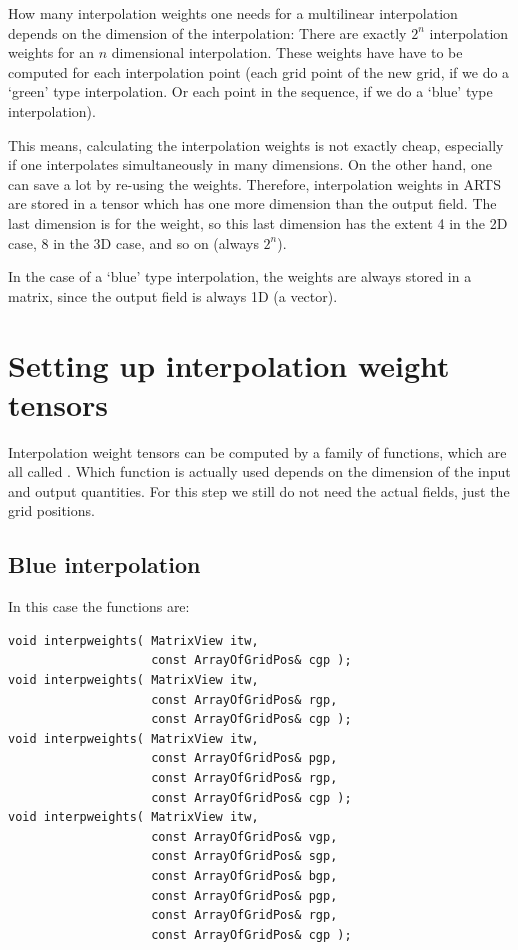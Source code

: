 How many interpolation weights one needs for a multilinear
interpolation depends on the dimension of the interpolation: There are
exactly $2^n$ interpolation weights for an $n$ dimensional
interpolation.  These weights have have to be computed for each
interpolation point (each grid point of the new grid, if we do a
`green' type interpolation. Or each point in the sequence, if we do a
`blue' type interpolation).

This means, calculating the interpolation weights is not exactly
cheap, especially if one interpolates simultaneously in many
dimensions. On the other hand, one can save a lot by re-using the
weights.  Therefore, interpolation weights in ARTS are stored in a
tensor which has one more dimension than the output field. The last
dimension is for the weight, so this last dimension has the extent 4
in the 2D case, 8 in the 3D case, and so on (always $2^n$).

In the case of a `blue' type interpolation, the weights are
always stored in a matrix, since the output field is always 1D (a
vector). 

\section{Setting up interpolation weight tensors}

Interpolation weight tensors can be computed by a family of functions,
which are all called . Which function is actually
used depends on the dimension of the input and output quantities. For
this step we still do not need the actual fields, just the grid
positions.

\subsection{Blue interpolation}

In this case the functions are:

\begin{lstlisting}
void interpweights( MatrixView itw,
                    const ArrayOfGridPos& cgp );
void interpweights( MatrixView itw,
                    const ArrayOfGridPos& rgp,
                    const ArrayOfGridPos& cgp );
void interpweights( MatrixView itw,
                    const ArrayOfGridPos& pgp,
                    const ArrayOfGridPos& rgp,
                    const ArrayOfGridPos& cgp );
void interpweights( MatrixView itw,
                    const ArrayOfGridPos& vgp,
                    const ArrayOfGridPos& sgp,
                    const ArrayOfGridPos& bgp,
                    const ArrayOfGridPos& pgp,
                    const ArrayOfGridPos& rgp,
                    const ArrayOfGridPos& cgp );
\end{lstlisting}


